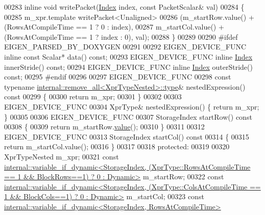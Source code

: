 \begin{DoxyCode}
00283     \textcolor{keyword}{inline} \textcolor{keywordtype}{void} writePacket(\hyperlink{namespace_eigen_a62e77e0933482dafde8fe197d9a2cfde}{Index} index, \textcolor{keyword}{const} PacketScalar& val)
00284     \{
00285       m\_xpr.template writePacket<Unaligned>
00286          (m\_startRow.value() + (RowsAtCompileTime == 1 ? 0 : index),
00287           m\_startCol.value() + (RowsAtCompileTime == 1 ? index : 0), val);
00288     \}
00289 
00290 \textcolor{preprocessor}{    #ifdef EIGEN\_PARSED\_BY\_DOXYGEN}
00291 
00292     EIGEN\_DEVICE\_FUNC \textcolor{keyword}{inline} \textcolor{keyword}{const} Scalar* data() \textcolor{keyword}{const};
00293     EIGEN\_DEVICE\_FUNC \textcolor{keyword}{inline} \hyperlink{namespace_eigen_a62e77e0933482dafde8fe197d9a2cfde}{Index} innerStride() \textcolor{keyword}{const};
00294     EIGEN\_DEVICE\_FUNC \textcolor{keyword}{inline} \hyperlink{namespace_eigen_a62e77e0933482dafde8fe197d9a2cfde}{Index} outerStride() \textcolor{keyword}{const};
00295 \textcolor{preprocessor}{    #endif}
00296 
00297     EIGEN\_DEVICE\_FUNC
00298     \textcolor{keyword}{const} \textcolor{keyword}{typename} \hyperlink{group___sparse_core___module}{internal::remove\_all<XprTypeNested>::type}& 
      nestedExpression()\textcolor{keyword}{ const}
00299 \textcolor{keyword}{    }\{ 
00300       \textcolor{keywordflow}{return} m\_xpr; 
00301     \}
00302 
00303     EIGEN\_DEVICE\_FUNC
00304     XprType& nestedExpression() \{ \textcolor{keywordflow}{return} m\_xpr; \}
00305       
00306     EIGEN\_DEVICE\_FUNC
00307     StorageIndex startRow()\textcolor{keyword}{ const}
00308 \textcolor{keyword}{    }\{ 
00309       \textcolor{keywordflow}{return} m\_startRow.\hyperlink{group___sparse_core___module_a003ea53c6559b106406f7916d6610547}{value}(); 
00310     \}
00311       
00312     EIGEN\_DEVICE\_FUNC
00313     StorageIndex startCol()\textcolor{keyword}{ const}
00314 \textcolor{keyword}{    }\{ 
00315       \textcolor{keywordflow}{return} m\_startCol.value(); 
00316     \}
00317 
00318   \textcolor{keyword}{protected}:
00319 
00320     XprTypeNested m\_xpr;
00321     \textcolor{keyword}{const} 
      \hyperlink{class_eigen_1_1internal_1_1variable__if__dynamic}{internal::variable\_if\_dynamic<StorageIndex, (XprType::RowsAtCompileTime == 1 && BlockRows==1) ? 0 :
       Dynamic>}
       m\_startRow;
00322     \textcolor{keyword}{const} 
      \hyperlink{class_eigen_1_1internal_1_1variable__if__dynamic}{internal::variable\_if\_dynamic<StorageIndex, (XprType::ColsAtCompileTime == 1 && BlockCols==1) ? 0 :
       Dynamic>}
       m\_startCol;
00323     \textcolor{keyword}{const} \hyperlink{class_eigen_1_1internal_1_1variable__if__dynamic}{internal::variable\_if\_dynamic<StorageIndex, RowsAtCompileTime>}

\end{DoxyCode}
